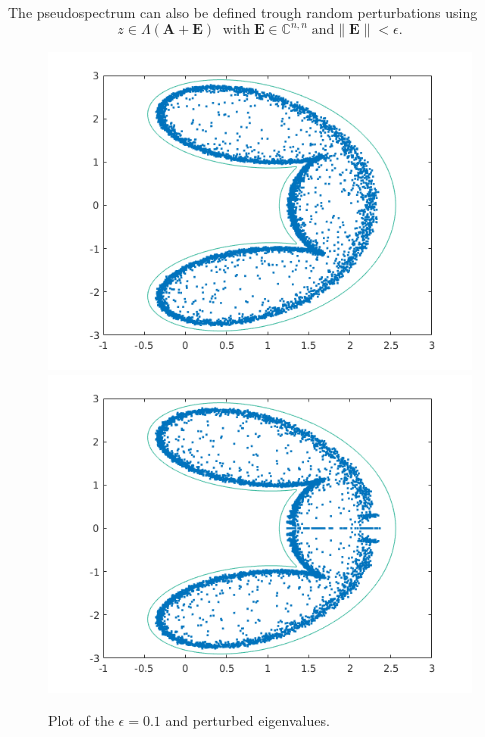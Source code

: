 The pseudospectrum can also be defined trough random perturbations using 
\begin{equation}
 z \in \Lambda(\mathbf{A} + \mathbf{E}) \;\; \text{with} \; \mathbf{E} \in \mathbb{C}^{n,n} \; \text{and} \|\mathbf{E}\| < \epsilon.
\end{equation}

\begin{figure}
\includegraphics[width=0.5\linewidth]{../src/figures/randPert}
\includegraphics[width=0.5\linewidth]{../src/figures/randPertReal}
\caption{Plot of the $\epsilon = 0.1$ and perturbed eigenvalues. }
\label{fig:randPerts}
\end{figure}
